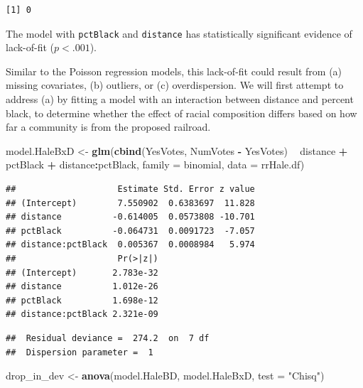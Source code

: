 \documentclass[
]{krantz}
\newenvironment{Shaded}{\begin{snugshade}}{\end{snugshade}}
\newcommand{\DataTypeTok}[1]{\textcolor[rgb]{0.27,0.27,0.27}{#1}}
\newcommand{\KeywordTok}[1]{\textcolor[rgb]{0.27,0.27,0.27}{\textbf{#1}}}
\newcommand{\NormalTok}[1]{#1}
\newcommand{\OperatorTok}[1]{\textcolor[rgb]{0.43,0.43,0.43}{\textbf{#1}}}
\newcommand{\StringTok}[1]{\textcolor[rgb]{0.5,0.5,0.5}{#1}}
\begin{document}
\begin{verbatim}
[1] 0
\end{verbatim}

The model with \texttt{pctBlack} and \texttt{distance} has statistically significant evidence of lack-of-fit (\(p<.001\)).

Similar to the Poisson regression models, this lack-of-fit  could result from (a) missing covariates, (b) outliers, or (c) overdispersion. We will first attempt to address (a) by fitting a model with an interaction between distance and percent black, to determine whether the effect of racial composition differs based on how far a community is from the proposed railroad.

\begin{Shaded}
\begin{Highlighting}[]
\NormalTok{model.HaleBxD <-}\StringTok{ }\KeywordTok{glm}\NormalTok{(}\KeywordTok{cbind}\NormalTok{(YesVotes, NumVotes }\OperatorTok{-}\StringTok{ }\NormalTok{YesVotes) }\OperatorTok{~}
\StringTok{  }\NormalTok{distance }\OperatorTok{+}\StringTok{ }\NormalTok{pctBlack }\OperatorTok{+}\StringTok{ }\NormalTok{distance}\OperatorTok{:}\NormalTok{pctBlack, }
  \DataTypeTok{family =}\NormalTok{ binomial, }\DataTypeTok{data =}\NormalTok{ rrHale.df)}
\end{Highlighting}
\end{Shaded}

\begin{verbatim}
##                    Estimate Std. Error z value
## (Intercept)        7.550902  0.6383697  11.828
## distance          -0.614005  0.0573808 -10.701
## pctBlack          -0.064731  0.0091723  -7.057
## distance:pctBlack  0.005367  0.0008984   5.974
##                    Pr(>|z|)
## (Intercept)       2.783e-32
## distance          1.012e-26
## pctBlack          1.698e-12
## distance:pctBlack 2.321e-09
\end{verbatim}

\begin{verbatim}
##  Residual deviance =  274.2  on  7 df 
##  Dispersion parameter =  1
\end{verbatim}

\begin{Shaded}
\begin{Highlighting}[]
\NormalTok{drop_in_dev <-}\StringTok{ }\KeywordTok{anova}\NormalTok{(model.HaleBD, model.HaleBxD, }
                     \DataTypeTok{test =} \StringTok{"Chisq"}\NormalTok{)}
\end{Highlighting}
\end{Shaded}
\end{document}
